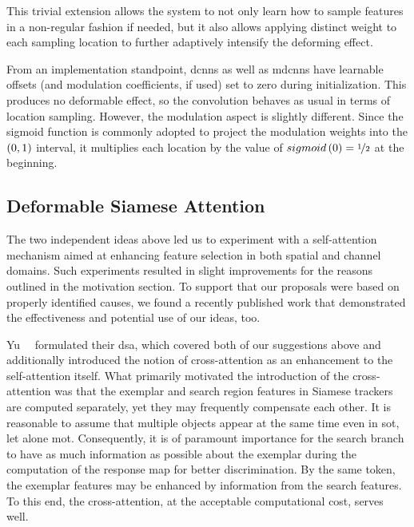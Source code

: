 This trivial extension allows the system to not only learn how to sample features in a non-regular fashion if needed, but it also allows applying distinct weight to each sampling location to further adaptively intensify the deforming effect.

From an implementation standpoint, \glspl{dcnn} as well as \glspl{mdcnn} have learnable offsets (and modulation coefficients, if used) set to zero during initialization. This produces no deformable effect, so the convolution behaves as usual in terms of location sampling. However, the modulation aspect is slightly different. Since the sigmoid function is commonly adopted to project the modulation weights into the $\left( {0, 1} \right)$ interval, it multiplies each location by the value of ${sigmoid} \left( 0 \right) = \nicefrac{1}{2}$ at the beginning.

\subsection{Deformable Siamese Attention}
\label{ssec:DeformableSiameseAttention}

The two independent ideas above led us to experiment with a self-attention mechanism aimed at enhancing feature selection in both spatial and channel domains. Such experiments resulted in slight improvements for the reasons outlined in the motivation section. To support that our proposals were based on properly identified causes, we found a recently published work that demonstrated the effectiveness and potential use of our ideas, too.

Yu~\etal{}~\cite{yu2021dsa} formulated their \gls{dsa}, which covered both of our suggestions above and additionally introduced the notion of cross-attention as an enhancement to the self-attention itself. What primarily motivated the introduction of the cross-attention was that the exemplar and search region features in Siamese trackers are computed separately, yet they may frequently compensate each other. It is reasonable to assume that multiple objects appear at the same time even in \gls{sot}, let alone \gls{mot}. Consequently, it is of paramount importance for the search branch to have as much information as possible about the exemplar during the computation of the response map for better discrimination. By the same token, the exemplar features may be enhanced by information from the search features. To this end, the cross-attention, at the acceptable computational cost, serves well.

